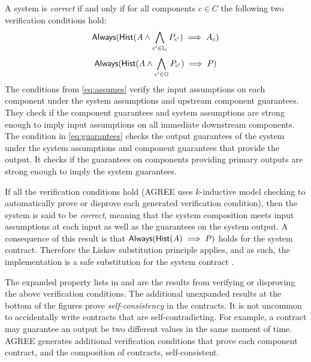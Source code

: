 A system is
\emph{correct} if and only if for all components $c \in C$ the
following two verification conditions hold:
\begin{equation}\label{eq:assumes}
            \mathsf{Always}(\mathsf{Hist}(A \wedge
            \bigwedge_{c^\prime \in \mathbb{I}_{c}} P_{c^\prime})
            \implies A_{c})
\end{equation}
\begin{equation}\label{eq:guarantees}
            \mathsf{Always}(\mathsf{Hist}(A \wedge
            \bigwedge_{c^\prime \in \mathbb{O}} P_{c^\prime})
            \implies P)
\end{equation}
The conditions from \eqref{eq:assumes} verify the input assumptions on each component under
the system assumptions and upstream component guarantees.  They check
if the component guarantees and system assumptions are strong enough
to imply input assumptions on all immediate downstream components.
The condition in \eqref{eq:guarantees} checks the output guarantees of the system under the
system assumptions and component guarantees that provide the output.
It checks if the guarantees on components providing primary outputs
are strong enough to imply the system guarantees.

If all the verification conditions hold (AGREE uses $k$-inductive
model checking to automatically prove or disprove each generated
verification condition), then the system is said to be \emph{correct},
meaning that the system composition meets input assumptions at each
input as well as the guarantees on the system output. A consequence of
this result is that $\mathsf{Always}(\mathsf{Hist}(A) \implies
P)$ holds for the system contract.
Therefore the Liskov substitution principle applies, and as such, the implementation is a safe substitution for the system contract \cite{10.1145/62139.62141}.

The expanded property lists in  and
 are the results from verifying or
disproving the above verification conditions.  The additional
unexpanded results at the bottom of the figures prove
\emph{self-consistency} in the contracts.  It is not uncommon to
accidentally write contracts that are self-contradicting.  For
example, a contract may guarantee an output be two different values in
the same moment of time.  AGREE generates additional verification
conditions that prove each component contract, and the composition of
contracts, self-consistent.
